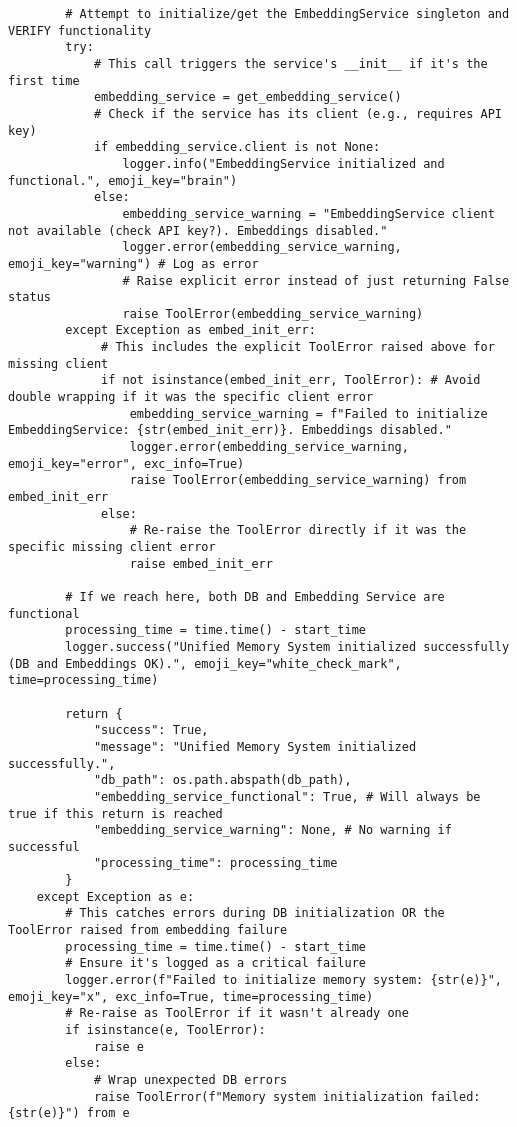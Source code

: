 \documentclass[12pt,a4paper]{article}
\begin{document}
\begin{pageablecode}
\begin{verbatim}
        # Attempt to initialize/get the EmbeddingService singleton and VERIFY functionality
        try:
            # This call triggers the service's __init__ if it's the first time
            embedding_service = get_embedding_service()
            # Check if the service has its client (e.g., requires API key)
            if embedding_service.client is not None:
                logger.info("EmbeddingService initialized and functional.", emoji_key="brain")
            else:
                embedding_service_warning = "EmbeddingService client not available (check API key?). Embeddings disabled."
                logger.error(embedding_service_warning, emoji_key="warning") # Log as error
                # Raise explicit error instead of just returning False status
                raise ToolError(embedding_service_warning)
        except Exception as embed_init_err:
             # This includes the explicit ToolError raised above for missing client
             if not isinstance(embed_init_err, ToolError): # Avoid double wrapping if it was the specific client error
                 embedding_service_warning = f"Failed to initialize EmbeddingService: {str(embed_init_err)}. Embeddings disabled."
                 logger.error(embedding_service_warning, emoji_key="error", exc_info=True)
                 raise ToolError(embedding_service_warning) from embed_init_err
             else:
                 # Re-raise the ToolError directly if it was the specific missing client error
                 raise embed_init_err

        # If we reach here, both DB and Embedding Service are functional
        processing_time = time.time() - start_time
        logger.success("Unified Memory System initialized successfully (DB and Embeddings OK).", emoji_key="white_check_mark", time=processing_time)

        return {
            "success": True,
            "message": "Unified Memory System initialized successfully.",
            "db_path": os.path.abspath(db_path),
            "embedding_service_functional": True, # Will always be true if this return is reached
            "embedding_service_warning": None, # No warning if successful
            "processing_time": processing_time
        }
    except Exception as e:
        # This catches errors during DB initialization OR the ToolError raised from embedding failure
        processing_time = time.time() - start_time
        # Ensure it's logged as a critical failure
        logger.error(f"Failed to initialize memory system: {str(e)}", emoji_key="x", exc_info=True, time=processing_time)
        # Re-raise as ToolError if it wasn't already one
        if isinstance(e, ToolError):
            raise e
        else:
            # Wrap unexpected DB errors
            raise ToolError(f"Memory system initialization failed: {str(e)}") from e


\end{verbatim}
\end{pageablecode}
\end{document}
